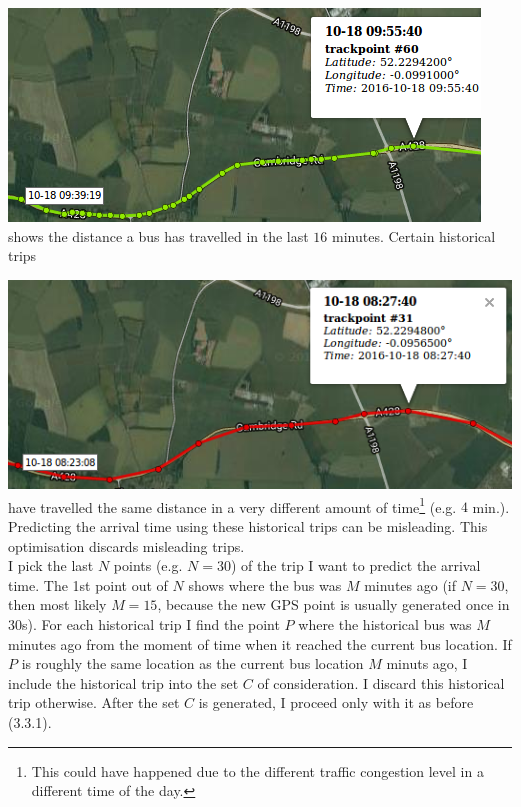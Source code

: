 \documentclass[12pt,a4paper,oneside,openright]{report}
\begin{document}
\includegraphics[scale = 0.7]{figs/recent_trip.png} \\

shows the distance a bus has travelled in the last $16$ minutes. Certain historical
trips

\includegraphics[scale = 0.7]{figs/inaccurate_historical.png} \\

have travelled the same distance in a very different amount of 
time\footnote{This could have happened due to the different traffic congestion level
in a different time of the day.} (e.g. $4$ min.). Predicting the arrival time using
these historical trips can be misleading. This optimisation discards misleading
trips. \\

I pick the last $N$ points (e.g. $N = 30$) of the trip I want to predict the arrival
time. The 1st point out of $N$ shows where the bus was $M$ minutes ago (if $N=30$, then
most likely $M=15$, because the new GPS point is usually generated once in 30s).
For each historical trip I find the point $P$ where the historical bus was $M$ minutes
ago from the moment of time when it reached the current bus location. If $P$ is roughly
the same location as the current bus location $M$ minuts ago, I include the historical
trip into the set $C$ of consideration. I discard this historical trip otherwise.
After the set $C$ is generated, I proceed only with it as before (3.3.1). \\
\end{document}
